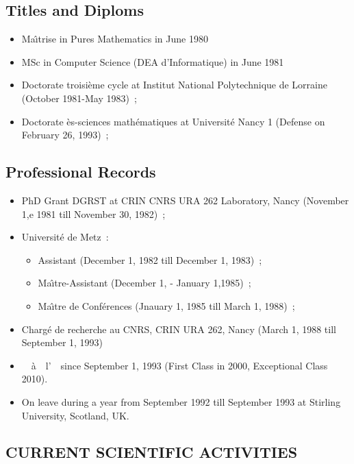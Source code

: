 \documentclass[ 12pt]{article}
\begin{document}
\subsection{Titles and Diploms}

\begin{itemize}
\item Ma\^{\i}trise in Pures Mathematics in June 1980
\item MSc in Computer Science (DEA d'Informatique) in June  1981
\item Doctorate troisi\`eme cycle  at Institut National Polytechnique de Lorraine  (October 1981-May 1983)~;
\item Doctorate \`es-sciences math\'ematiques at Universit\'e Nancy 1 (Defense on February 26, 1993)~;
\end{itemize}

\subsection{Professional Records}


\begin{itemize}
\item PhD Grant  DGRST  at  CRIN CNRS URA 262 Laboratory,   Nancy  (November 1,e 1981 till November 30, 1982)~;
\item Universit\'e de Metz~:
  \begin{itemize}
  \item Assistant  (December 1,  1982 till December 1,  1983)~;
  \item Ma\^{\i}tre-Assistant (December 1, - January 1,1985)~;
  \item Ma\^{\i}tre de Conf\'erences (Jnauary 1, 1985 till March 1, 1988)~;
  \end{itemize}
\item Charg\'e de recherche au CNRS, CRIN URA 262, Nancy (March 1, 1988 till  September 1, 1993)
\item \pr~~\`a~~l'~\inancyIesial\ since September 1, 1993 (First Class in 2000, Exceptional Class 2010).


\item On leave  during a year  from September 1992 till September 1993 at Stirling University, Scotland, UK.


\end{itemize}


\subsection{CURRENT SCIENTIFIC ACTIVITIES}
\end{document}
